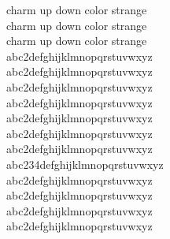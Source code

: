 \documentclass{article}
\begin{document}

%


charm up down color strange\\
charm {up} {down color} strange\\
charm up down color strange\\


abc2defghijklmnopqrstuvwxyz\\
abc{2}defghijklmnopqrstuvwxyz\\
abc2defghijklmnopqrstuvwxyz\\

abc2defghijklmnopqrstuvwxyz\\
abc{2}defghijklmnopqrstuvwxyz\\
abc2defghijklmnopqrstuvwxyz\\

abc2defghijklmnopqrstuvwxyz\\
abc{234}defghijklmnopqrstuvwxyz\\
abc2defghijklmnopqrstuvwxyz\\

abc2defghijklmnopqrstuvwxyz\\
abc{2}defghijklmnopqrstuvwxyz\\
abc2defghijklmnopqrstuvwxyz\\


%
\end{document}
